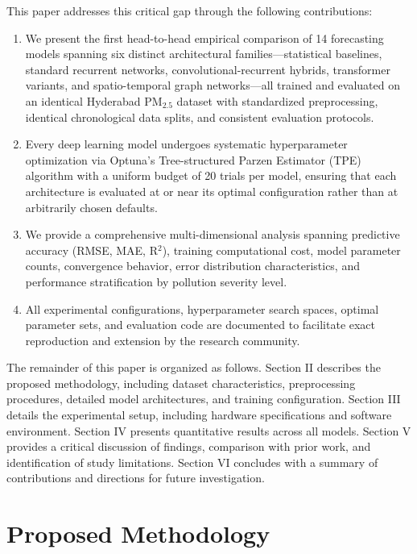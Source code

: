 \documentclass[conference]{IEEEtran}
\begin{document}
This paper addresses this critical gap through the following contributions:

\begin{enumerate}
\item We present the first head-to-head empirical comparison of 14 forecasting models spanning six distinct architectural families---statistical baselines, standard recurrent networks, convolutional-recurrent hybrids, transformer variants, and spatio-temporal graph networks---all trained and evaluated on an identical Hyderabad PM$_{2.5}$ dataset with standardized preprocessing, identical chronological data splits, and consistent evaluation protocols.

\item Every deep learning model undergoes systematic hyperparameter optimization via Optuna's Tree-structured Parzen Estimator (TPE) algorithm with a uniform budget of 20 trials per model, ensuring that each architecture is evaluated at or near its optimal configuration rather than at arbitrarily chosen defaults.

\item We provide a comprehensive multi-dimensional analysis spanning predictive accuracy (RMSE, MAE, R$^{2}$), training computational cost, model parameter counts, convergence behavior, error distribution characteristics, and performance stratification by pollution severity level.

\item All experimental configurations, hyperparameter search spaces, optimal parameter sets, and evaluation code are documented to facilitate exact reproduction and extension by the research community.
\end{enumerate}

The remainder of this paper is organized as follows. Section II describes the proposed methodology, including dataset characteristics, preprocessing procedures, detailed model architectures, and training configuration. Section III details the experimental setup, including hardware specifications and software environment. Section IV presents quantitative results across all models. Section V provides a critical discussion of findings, comparison with prior work, and identification of study limitations. Section VI concludes with a summary of contributions and directions for future investigation.

\section{Proposed Methodology}
\end{document}
